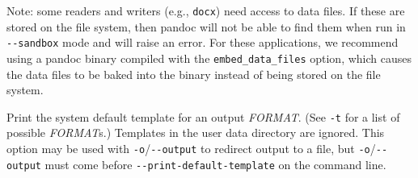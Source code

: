 \documentclass[
  b5paper
]{book}
\begin{document}
\begin{description}
Note: some readers and writers (e.g., \texttt{docx}) need access to data
files. If these are stored on the file system, then pandoc will not be
able to find them when run in \texttt{-\/-sandbox} mode and will raise
an error. For these applications, we recommend using a pandoc binary
compiled with the \texttt{embed\_data\_files} option, which causes the
data files to be baked into the binary instead of being stored on the
file system.
\item[\texttt{-D} \emph{FORMAT},
\texttt{-\/-print-default-template=}\emph{FORMAT}]
Print the system default template for an output \emph{FORMAT}. (See
\texttt{-t} for a list of possible \emph{FORMAT}s.) Templates in the
user data directory are ignored. This option may be used with
\texttt{-o}/\texttt{-\/-output} to redirect output to a file, but
\texttt{-o}/\texttt{-\/-output} must come before
\texttt{-\/-print-default-template} on the command line.


\end{description}
\end{document}
